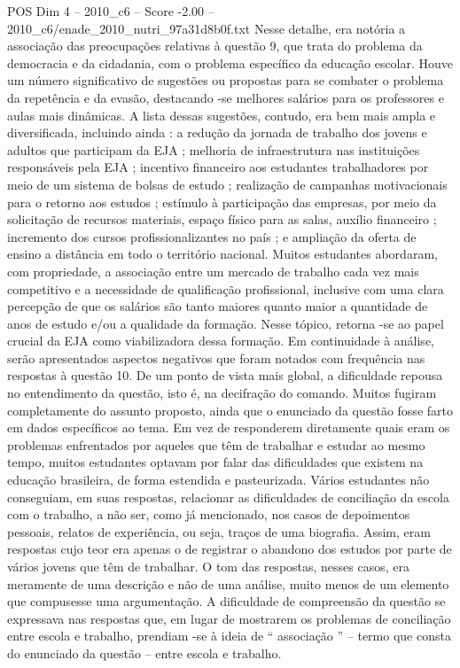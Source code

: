 \begin{textsample}{POS Dim 4 – 2010\_c6 – Score -2.00 – 2010\_c6/enade\_2010\_nutri\_97a31d8b0f.txt}
Nesse detalhe, era notória a associação das preocupações relativas à questão 9, que trata do problema da democracia e da cidadania, com o problema específico da educação escolar.
Houve um número significativo de sugestões ou propostas para se combater o problema da repetência e da evasão, destacando -se melhores salários para os professores e aulas mais dinâmicas.
A lista dessas sugestões, contudo, era bem mais ampla e diversificada, incluindo ainda : a redução da jornada de trabalho dos jovens e adultos que participam da EJA ; melhoria de infraestrutura nas instituições responsáveis pela EJA ; incentivo financeiro aos estudantes trabalhadores por meio de um sistema de bolsas de estudo ; realização de campanhas motivacionais para o retorno aos estudos ; estímulo à participação das empresas, por meio da solicitação de recursos materiais, espaço físico para as salas, auxílio financeiro ; incremento dos cursos profissionalizantes no país ; e ampliação da oferta de ensino a distância em todo o território nacional.
Muitos estudantes abordaram, com propriedade, a associação entre um mercado de trabalho cada vez mais competitivo e a necessidade de qualificação profissional, inclusive com uma clara percepção de que os salários são tanto maiores quanto maior a quantidade de anos de estudo e/ou a qualidade da formação.
Nesse tópico, retorna -se ao papel crucial da EJA como viabilizadora dessa formação.
Em continuidade à análise, serão apresentados aspectos negativos que foram notados com frequência nas respostas à questão 10.
De um ponto de vista mais global, a dificuldade repousa no entendimento da questão, isto é, na decifração do comando.
Muitos fugiram completamente do assunto proposto, ainda que o enunciado da questão fosse farto em dados específicos ao tema.
Em vez de responderem diretamente quais eram os problemas enfrentados por aqueles que têm de trabalhar e estudar ao mesmo tempo, muitos estudantes optavam por falar das dificuldades que existem na educação brasileira, de forma estendida e pasteurizada.
Vários estudantes não conseguiam, em suas respostas, relacionar as dificuldades de conciliação da escola com o trabalho, a não ser, como já mencionado, nos casos de depoimentos pessoais, relatos de experiência, ou seja, traços de uma biografia.
Assim, eram respostas cujo teor era apenas o de registrar o abandono dos estudos por parte de vários jovens que têm de trabalhar.
O tom das respostas, nesses casos, era meramente de uma descrição e não de uma análise, muito menos de um elemento que compusesse uma argumentação.
A dificuldade de compreensão da questão se expressava nas respostas que, em lugar de mostrarem os problemas de conciliação entre escola e trabalho, prendiam -se à ideia de “ associação ” – termo que consta do enunciado da questão – entre escola e trabalho.

\end{textsample}
